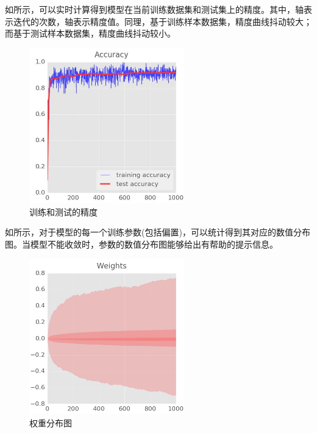\begin{content}
\begin{content}
如所示，可以实时计算得到模型在当前训练数据集和测试集上的精度。其中，轴表示迭代的次数，轴表示精度值。同理，基于训练样本数据集，精度曲线抖动较大；而基于测试样本数据集，精度曲线抖动较小。

\begin{figure}[H]
\centering
\includegraphics[width=0.6\textwidth]{figures/mnist-accuracy-fig.jpeg}
\caption{训练和测试的精度}
 \label{fig:mnist-accuracy-fig}
\end{figure}

如所示，对于模型的每一个训练参数(包括偏置)，可以统计得到其对应的数值分布图。当模型不能收敛时，参数的数值分布图能够给出有帮助的提示信息。

\begin{figure}[H]
\centering
\includegraphics[width=0.6\textwidth]{figures/mnist-weight-fig.png}
\caption{权重分布图}
 \label{fig:mnist-weight-fig}
\end{figure}

\end{content}


\end{content}
